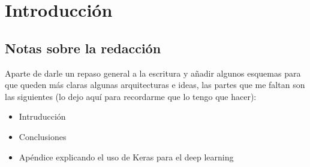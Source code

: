 
\chapter{Introducción} %

\label{Chapter1} %


\newcommand{\keyword}[1]{\textbf{#1}}
\newcommand{\tabhead}[1]{\textbf{#1}}
\newcommand{\code}[1]{\texttt{#1}}
\newcommand{\file}[1]{\texttt{\bfseries#1}}
\newcommand{\option}[1]{\texttt{\itshape#1}}


\section{Notas sobre la redacción}

Aparte de darle un repaso general a la escritura y añadir algunos esquemas para que queden más claras algunas arquitecturas e ideas, las partes que me faltan son las siguientes (lo dejo aquí para recordarme que lo tengo que hacer):

\begin{itemize}
    \item{Intruducción}
    \item{Conclusiones}
    \item{Apéndice explicando el uso de Keras para el deep learning}
\end{itemize}




